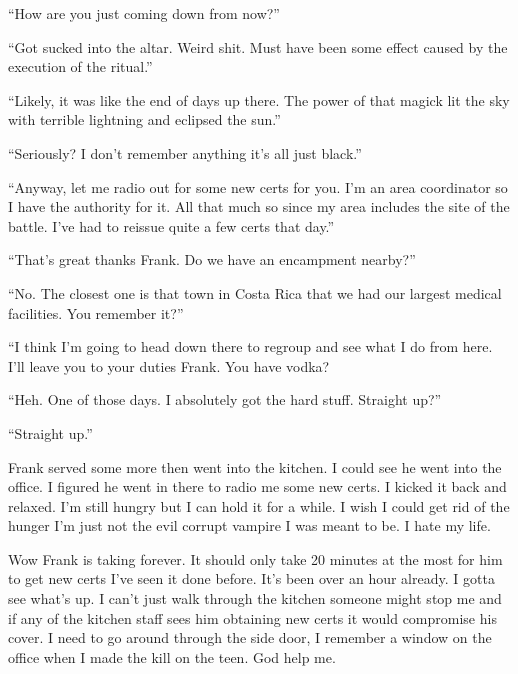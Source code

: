 ``How are you just coming down from \chichenitza now?''

``Got sucked into the altar. Weird shit. Must have been some effect caused by the execution of the ritual.''

``Likely, it was like the end of days up there. The power of that magick lit the sky with terrible lightning and eclipsed the sun.''

``Seriously? I don't remember anything it's all just black.''

``Anyway, let me radio out for some new certs for you. I'm an area coordinator so I have the authority for it. All that much so since my area includes the site of the battle. I've had to reissue quite a few certs that day.''

``That's great thanks Frank. Do we have an encampment nearby?''

``No. The closest one is that town in Costa Rica that we had our largest medical facilities. You remember it?''

``I think I'm going to head down there to regroup and see what I do from here. I'll leave you to your duties Frank. You have vodka?

``Heh. One of those days. I absolutely got the hard stuff. Straight up?''

``Straight up.''

Frank served some more then went into the kitchen. I could see he went into the office. I figured he went in there to radio me some new certs. I kicked it back and relaxed. I'm still hungry but I can hold it for a while. I wish I could get rid of the hunger I'm just not the evil corrupt vampire I was meant to be. I hate my life.

Wow Frank is taking forever. It should only take 20 minutes at the most for him to get new certs I've seen it done before. It's been over an hour already. I gotta see what's up. I can't just walk through the kitchen someone might stop me and if any of the kitchen staff sees him obtaining new certs it would compromise his cover. I need to go around through the side door, I remember a window on the office when I made the kill on the teen. God help me.





















